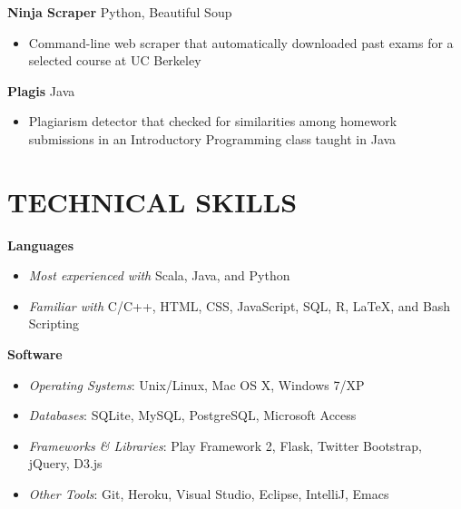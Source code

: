 \documentclass[margin]{res}
\begin{document}
\begin{resume}
\textbf{Ninja Scraper} \hfill Python, Beautiful Soup
\begin{itemize}[leftmargin=10pt]
\item Command-line web scraper that automatically downloaded past exams for a selected course at UC Berkeley 
\end{itemize}

\textbf{Plagis} \hfill Java
\begin{itemize}[leftmargin=10pt]
\item Plagiarism detector that checked for similarities among homework submissions in an Introductory Programming class taught in Java
\end{itemize}

\section{TECHNICAL SKILLS}
\textbf{Languages}
\begin{itemize}[leftmargin=10pt]
\item \textit{Most experienced with} Scala, Java, and Python
\item \textit{Familiar with} C/C++, HTML, CSS, JavaScript, SQL, R, \LaTeX{}, and Bash Scripting
\end{itemize}

\textbf{Software}
\begin{itemize}[leftmargin=10pt]
\item \textit{Operating Systems}: Unix/Linux, Mac OS X, Windows 7/XP
\item \textit{Databases}: SQLite, MySQL, PostgreSQL, Microsoft Access
\item \textit{Frameworks \& Libraries}: Play Framework 2, Flask, Twitter Bootstrap, jQuery, D3.js
\item \textit{Other Tools}: Git, Heroku, Visual Studio, Eclipse, IntelliJ, Emacs
\end{itemize}

\end{resume}
\end{document}
